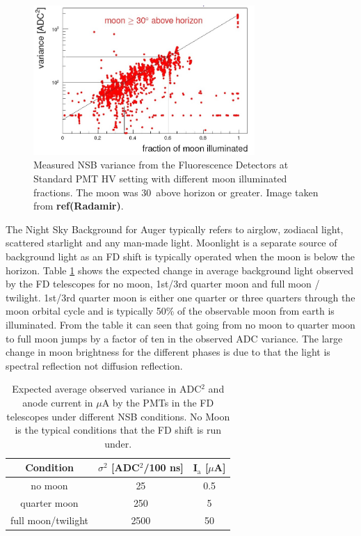 \begin{figure}
\centering
\includegraphics[width=0.75\textwidth]{chapters/pix/SelEff/BGLoop_Variance_crop.jpg}
\caption{Measured NSB variance from the Fluorescence Detectors at Standard PMT HV setting with different moon illuminated fractions. The moon was 30\textdegree \ above horizon or greater. Image taken from \textbf{ref(Radamir)}.} \label{fig:ADCvarVSmoonIllumFrac}
\end{figure}

The Night Sky Background for Auger typically refers to airglow, zodiacal light, scattered starlight and any man-made light. Moonlight is a separate source of background light as an FD shift is typically operated when the moon is below the horizon. Table \ref{tab:MoonLightADC} shows the expected change in average background light observed by the FD telescopes for no moon, 1st/3rd quarter moon and full moon / twilight. 1st/3rd quarter moon is either one quarter or three quarters through the moon orbital cycle and is typically 50\% of the observable moon from earth is illuminated. From the table it can seen that going from no moon to quarter moon to full moon jumps by a factor of ten in the observed ADC variance. The large change in moon brightness for the different phases is due to that the light is spectral reflection not diffusion reflection.

\begin{table}[h]
\centering
\begin{tabular}{c c c}
\hline\hline
Condition & $\sigma^2$ [ADC$^2$/100 ns] & I$_{\mathrm{a}}$ [$\mu$A] \\ \hline\hline
no moon & 25 & 0.5 \\
quarter moon & 250 & 5 \\
full moon/twilight & 2500 & 50 \\ 
\hline\hline
\end{tabular}
\caption{Expected average observed variance in ADC$^2$ and anode current in $\mu$A by the PMTs in the FD telescopes under different NSB conditions. No Moon is the typical conditions that the FD shift is run under.  } \label{tab:MoonLightADC}
\end{table} 

